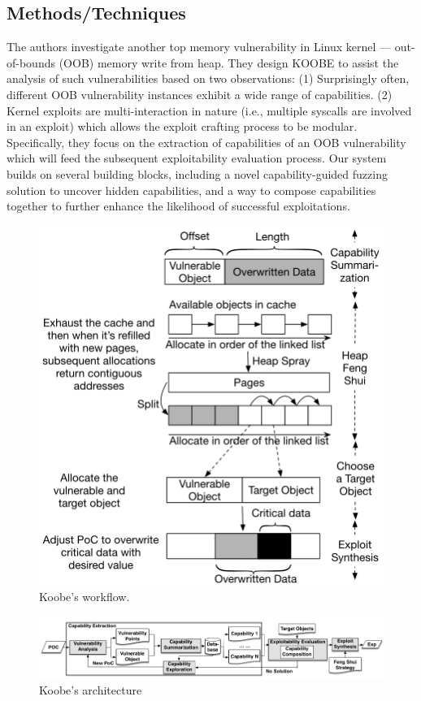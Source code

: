 \subsection{Methods/Techniques}
The authors investigate another top memory vulnerability in Linux kernel — out-of-bounds (OOB) memory write from heap. They design KOOBE to assist the analysis of such vulnerabilities based on two observations: (1) Surprisingly often, different OOB vulnerability instances exhibit a wide range of capabilities.  (2) Kernel exploits are multi-interaction in nature (i.e., multiple syscalls are involved in an exploit) which allows the exploit crafting process to be modular. Specifically, they focus on the extraction of capabilities of an OOB vulnerability which will feed the subsequent exploitability evaluation process. Our system builds on several building blocks, including a novel capability-guided fuzzing solution to uncover hidden capabilities, and a way to compose capabilities together to further enhance the likelihood of successful exploitations. 
\begin{figure}[h]
    \centering
    \includegraphics[width=0.6\linewidth]{koobe-flow.png} %
    \caption{Koobe's workflow.}	
    \label{fig:koobe-flow}
\end{figure}
\begin{figure}[h]
    \centering
    \includegraphics[width=\linewidth]{koobe.png} %
    \caption{Koobe's architecture}
    \label{fig:koobe}
\end{figure}
